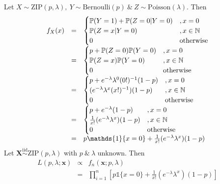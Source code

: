 \documentclass[11pt,a4paper]{article}
\begin{document}
\ans
Let $X\sim\mathrm{ZIP}(p,\lambda),\ Y\sim\mathrm{Bernoulli}(p)\ \&\ Z\sim\mathrm{Poisson}(\lambda)$. Then
\[\begin{array}{rcl}
f_X(x)&=&\begin{cases}
\prob(Y=1)+\prob(Z=0|Y=0)&, x=0\\
\prob(Z=x|Y=0)&, x\in\nats\\
0&\mathrm{otherwise}
\end{cases}\\
&=&\begin{cases}
p+\prob(Z=0)\prob(Y=0)&, x=0\\
\prob(Z=x)\prob(Y=0)&, x\in\nats\\
0&\mathrm{otherwise}
\end{cases}\\
&=&\begin{cases}
p+e^{-\lambda}\lambda^0(0!)^{-1}(1-p)&, x=0\\
(e^{-\lambda}\lambda^x(x!)^{-1})(1-p)&, x\in\nats\\
0&\mathrm{otherwise}
\end{cases}\\
&=&\begin{cases}
p+e^{-\lambda}(1-p)&, x=0\\
\frac{1}{x!}(e^{-\lambda}\lambda^x)(1-p)&, x\in\nats\\
0&\mathrm{otherwise}
\end{cases}\\
&=&p\mathds{1}\{x=0\}+\frac{1}{x!}(e^{-\lambda}\lambda^x)(1-p)
\end{array}\]
Let $\textbf{X}\overset{\mathrm{iid}}{\sim}\mathrm{ZIP}(p,\lambda)$ with $p\ \&\ \lambda$ unknown. Then
\[\begin{array}{rcl}
L(p,\lambda;\textbf{x})&\propto&f_n(\textbf{x};p,\lambda)\\
&=&\prod\limits_{i=1}^n\left[p\mathds{1}\{x=0\}+\frac{1}{x!}(e^{-\lambda}\lambda^x)(1-p)\right]
\end{array}\]
\end{document}
